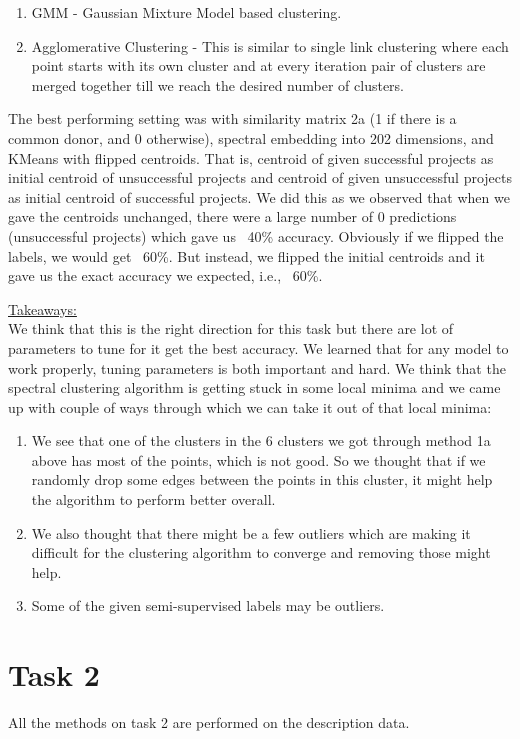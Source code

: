 \documentclass{article}
\begin{document}
\begin{enumerate}
\begin{enumerate}
\item GMM - Gaussian Mixture Model based clustering.
\item Agglomerative Clustering - This is similar to single link clustering where each point starts with its own cluster and at every iteration pair of clusters are merged together till we reach the desired number of clusters.
\end{enumerate}

The best performing setting was with similarity matrix 2a (1 if there is a common donor, and 0 otherwise), spectral embedding into 202 dimensions, and KMeans with flipped centroids. That is, centroid of given successful projects as initial centroid of unsuccessful projects and centroid of given unsuccessful projects as initial centroid of successful projects. We did this as we observed that when we gave the centroids unchanged, there were a large number of 0 predictions (unsuccessful projects) which gave us ~40\% accuracy. Obviously if we flipped the labels, we would get ~60\%. But instead, we flipped the initial centroids and it gave us the exact accuracy we expected, i.e., ~60\%.

\end{enumerate}
\underline{Takeaways:}\\

We think that this is the right direction for this task but there are lot of parameters to tune for it get the best accuracy. We learned that for any model to work properly, tuning parameters is both important and hard. We think that the spectral clustering algorithm is getting stuck in some local minima and we came up with couple of ways through which we can take it out of that local minima: %
\begin{enumerate}
\item We see that one of the clusters in the 6 clusters we got through method 1a above has most of the points, which is not good. So we thought that if we randomly drop some edges between the points in this cluster, it might help the algorithm to perform better overall.
\item We also thought that there might be a few outliers which are making it difficult for the clustering algorithm to converge and removing those might help.
\item Some of the given semi-supervised labels may be outliers. 

\end{enumerate}


\section*{Task 2}
All the methods on task 2 are performed on the description data.\\
\end{document}
